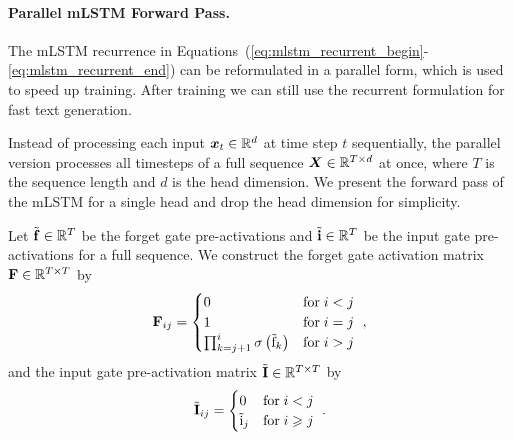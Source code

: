 \documentclass[dvipsnames]{article}
\begin{document}
\begin{appendix}
\paragraph{Parallel mLSTM Forward Pass.}
\label{sec:appmLSTMparallel}
The mLSTM recurrence in Equations~(\ref{eq:mlstm_recurrent_begin}-\ref{eq:mlstm_recurrent_end}) can be reformulated in a parallel form, which is used to speed up training.
After training we can still use the recurrent formulation for fast text generation.


Instead of processing each input $\bm{x}_t \in \mathbb{R}^d$ at time step $t$ sequentially,
the parallel version processes all timesteps of a full sequence $\bm{X} \in \mathbb{R}^{T \times d}$ at once, where $T$ is the sequence length and $d$ is the head dimension. 
We present the forward pass of the mLSTM for a single head and drop the head dimension for simplicity. %


Let $\tilde{\bm{\mathrm{f}}} \in \mathbb{R}^T$ be the forget gate pre-activations and $\tilde{\bm{\mathrm{i}}} \in \mathbb{R}^T$ be the input gate pre-activations for a full sequence.
We construct the forget gate activation matrix $\bm{\mathrm{F}} \in \mathbb{R}^{T \times T}$ by
\begin{equation}
    \bm{\rF}_{ij} = \begin{cases}
        0                                                  & \text{for} \; i < j \\ %
        1                                                  & \text{for} \; i = j \\ %
        \prod_{k=j+1}^{i} \sigma\left(\tilde{\Rf}_k\right) & \text{for} \; i > j %
    \end{cases} \ ,
\end{equation}
and the input gate pre-activation matrix $\tilde{\bm{\mathrm{I}}} \in \mathbb{R}^{T \times T}$ by
\begin{equation}
    \tilde{\bm{\rI}}_{ij} = \begin{cases}
        0     & \text{for} \; i < j \\ %
        \tilde{\Ri}_j & \text{for} \; i \geq j %
    \end{cases} \ .
\end{equation}


\end{appendix}
\end{document}
